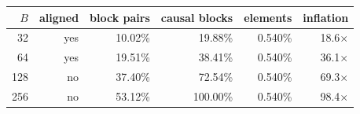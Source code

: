 \begin{tabular}{rrrrrr}
\toprule
$B$ & aligned & block pairs & causal blocks & elements & inflation \\
\midrule
32 & yes & 10.02\% & 19.88\% & 0.540\% & 18.6$\times$ \\
64 & yes & 19.51\% & 38.41\% & 0.540\% & 36.1$\times$ \\
128 & no & 37.40\% & 72.54\% & 0.540\% & 69.3$\times$ \\
256 & no & 53.12\% & 100.00\% & 0.540\% & 98.4$\times$ \\
\bottomrule
\end{tabular}
